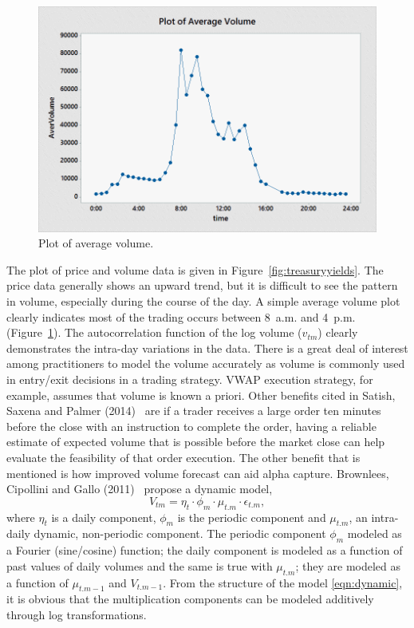         \begin{figure}[!ht]
        \centering
        \includegraphics[width=\textwidth]{chapters/chapter_stat_ts/figures/avgvol.png}
        \caption{Plot of average volume. \label{fig:averagevolume}}
        \end{figure}

The plot of price and volume data is given in Figure~\ref{fig:treasuryyields}. The price data generally shows an upward trend, but it is difficult to see the pattern in volume, especially during the course of the day. A simple average volume plot clearly indicates most of the trading occurs between 8~a.m. and 4~p.m. (Figure~\ref{fig:averagevolume}). The autocorrelation function of the log volume ($v_{tm}$) clearly demonstrates the intra-day variations in the data. There is a great deal of interest among practitioners to model the volume accurately as volume is commonly used in entry/exit decisions in a trading strategy. VWAP execution strategy, for example, assumes that volume is known a priori. Other benefits cited in Satish, Saxena and Palmer (2014)~\cite{satish} are if a trader receives a large order ten minutes before the close with an instruction to complete the order, having a reliable estimate of expected volume that is possible before the market close can help evaluate the feasibility of that order execution. The other benefit that is mentioned is how improved volume forecast can aid alpha capture. Brownlees, Cipollini and Gallo (2011)~\cite{brownless} propose a dynamic model,
	\begin{equation} \label{eqn:dynamic}
	V_{tm}= \eta_t \cdot \phi_m \cdot \mu_{t.m} \cdot \epsilon_{t.m},
	\end{equation}
where $\eta_t$ is a daily component, $\phi_m$ is the periodic component and $\mu_{t.m}$, an intra-daily dynamic, non-periodic component. The periodic component $\phi_m$ modeled as a Fourier (sine/cosine) function; the daily component is modeled as a function of past values of daily volumes and the same is true with $\mu_{t.m}$; they are modeled as a function of $\mu_{t.m-1}$ and $V_{t.m-1}$. From the structure of the model \eqref{eqn:dynamic}, it is obvious that the multiplication components can be modeled additively through log transformations.



